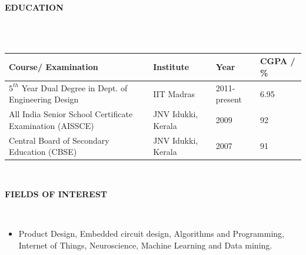 \documentclass[a4paper,10pt]{article}
\newcommand{\lsep}{-0.5cm}
\newcommand{\resheading}[1]{{\small \colorbox{mygrey}{\begin{minipage}{0.975\textwidth}{\textbf{#1 \vphantom{p\^{E}}}}\end{minipage}}}}
\begin{document}
\resheading{\textbf{EDUCATION} }\\[\lsep]
    \\

    \indent \begin{tabularx}{0.97\textwidth}{ X  p{3.4cm}  p{2.3cm} p{2cm} }
    \hline
    \textbf{Course/ Examination} & \textbf{Institute} & \textbf{Year} & \textbf{CGPA / \%} \\
    \hline
    $5^{th}$ Year Dual Degree in Dept. of Engineering Design & IIT Madras & 2011-present & 6.95\\
    All India Senior School Certificate Examination (AISSCE) & JNV Idukki, Kerala & 2009 & 92\\
    Central Board of Secondary Education (CBSE) & JNV Idukki, Kerala & 2007 & 91\\
    \hline
    \end{tabularx}
    \\


\resheading{\textbf{FIELDS OF INTEREST} }\\[\lsep]
    \begin{itemize}
        \item \noindent Product Design, Embedded circuit design, Algorithms and Programming, Internet of Things, Neuroscience, Machine Learning and Data mining.
    \end{itemize}
\end{document}

